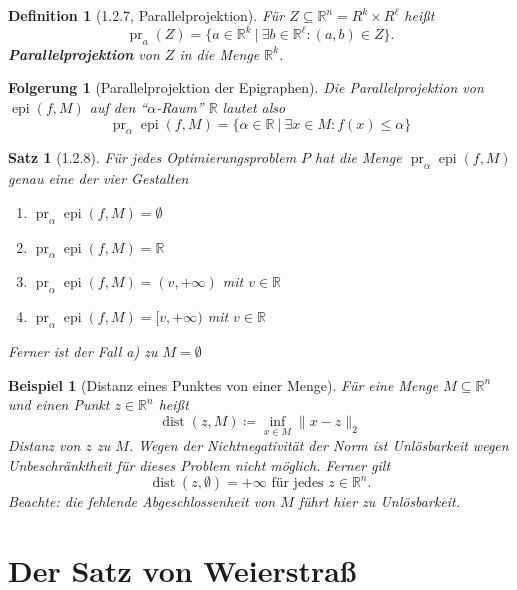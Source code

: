 \documentclass[12pt]{extreport} %
\newcommand{\R}{\mathbb{R}}
\theoremstyle{named}
\theoremstyle{nnamed}
\theoremstyle{itshape}
\newtheorem*{satz}{Satz}
\newtheorem*{definition}{Definition}
\theoremstyle{normal}
\newtheorem*{beispiel}{Beispiel}
\newtheorem*{folgerung}{Folgerung}
\begin{document}
\begin{definition}[1.2.7, Parallelprojektion]
	Für $Z \subseteq \R^n = R^k \times R^\ell$ heißt
	$$ \operatorname{pr}_a(Z) = \big\{ a \in \R^k ~|~\exists b \in \R^\ell \colon (a, b) \in Z \big\}. $$
	\textbf{Parallelprojektion} von $Z$ in die Menge $\R^k$.
\end{definition}

\begin{folgerung}[Parallelprojektion der Epigraphen]
	Die Parallelprojektion von $\operatorname{epi}(f, M)$ auf den \enquote{$\alpha$-Raum} $\R$ lautet also
	$$ \operatorname{pr}_\alpha \operatorname{epi}(f, M) = \big\{ \alpha \in \R ~|~\exists x \in M: f(x) \leq \alpha \big\} $$
\end{folgerung}

\begin{satz}[1.2.8]
	Für jedes Optimierungsproblem $P$ hat die Menge $\operatorname{pr}_{\alpha} \operatorname{epi}(f, M)$ genau eine der vier Gestalten
	\begin{enumerate}
		\item $\operatorname{pr}_{\alpha} \operatorname{epi}(f, M) = \emptyset$
		\item $\operatorname{pr}_{\alpha} \operatorname{epi}(f, M) = \R$
		\item $\operatorname{pr}_{\alpha} \operatorname{epi}(f, M) = (v, +\infty)$ mit $v \in \R$
		\item $\operatorname{pr}_{\alpha} \operatorname{epi}(f, M) = [v, +\infty)$ mit $v \in \R$
	\end{enumerate}
	Ferner ist der Fall a) zu $M =\emptyset$ %
\end{satz}

\begin{beispiel}[Distanz eines Punktes von einer Menge]
	Für eine Menge $M \subseteq \R^n$ und einen Punkt $z \in \R^n$ heißt
	$$ \operatorname{dist}(z, M) \coloneqq \inf_{x \in M} \| x - z \|_2 $$	
	Distanz von $z$ zu $M$. Wegen der Nichtnegativität der Norm ist Unlösbarkeit wegen Unbeschränktheit für dieses Problem nicht möglich. Ferner gilt 
	$$ \operatorname{dist}(z, \emptyset) = +\infty \text{ für jedes } z \in \R^n. $$
	Beachte: die fehlende Abgeschlossenheit von $M$ führt hier zu Unlösbarkeit.
\end{beispiel}

\newpage

\section{Der Satz von Weierstraß}
\end{document}
